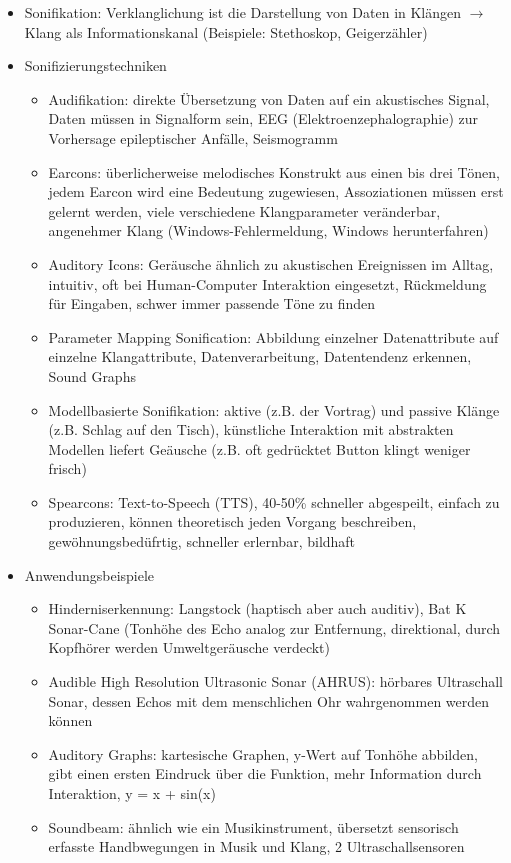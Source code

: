 \documentclass[paper=a4, fontsize=11pt]{scrartcl} %
\numberwithin{equation}{section} %
\numberwithin{figure}{section} %
\numberwithin{table}{section} %
\begin{document}
\begin{itemize}
\item Sonifikation: Verklanglichung ist die Darstellung von Daten in Klängen $\rightarrow$ Klang als Informationskanal (Beispiele: Stethoskop, Geigerzähler)
\item Sonifizierungstechniken
\begin{itemize}
\item Audifikation: direkte Übersetzung von Daten auf ein akustisches Signal, Daten müssen in Signalform sein, EEG (Elektroenzephalographie) zur Vorhersage epileptischer Anfälle, Seismogramm
\item Earcons: überlicherweise melodisches Konstrukt aus einen bis drei Tönen, jedem Earcon wird eine Bedeutung zugewiesen, Assoziationen müssen erst gelernt werden, viele verschiedene Klangparameter veränderbar, angenehmer Klang (Windows-Fehlermeldung, Windows herunterfahren)
\item Auditory Icons: Geräusche ähnlich zu akustischen Ereignissen im Alltag, intuitiv, oft bei Human-Computer Interaktion eingesetzt, Rückmeldung für Eingaben, schwer immer passende Töne zu finden
\item Parameter Mapping Sonification: Abbildung einzelner Datenattribute auf einzelne Klangattribute, Datenverarbeitung, Datentendenz erkennen, Sound Graphs
\item Modellbasierte Sonifikation: aktive (z.B. der Vortrag) und passive Klänge (z.B. Schlag auf den Tisch), künstliche Interaktion mit abstrakten Modellen liefert Geäusche (z.B. oft gedrücktet Button klingt weniger frisch)
\item Spearcons: Text-to-Speech (TTS), 40-50\% schneller abgespeilt, einfach zu produzieren, können theoretisch jeden Vorgang beschreiben, gewöhnungsbedüfrtig, schneller erlernbar, bildhaft
\end{itemize}
\item Anwendungsbeispiele
\begin{itemize}
\item Hinderniserkennung: Langstock (haptisch aber auch auditiv), Bat K Sonar-Cane (Tonhöhe des Echo analog zur Entfernung, direktional, durch Kopfhörer werden Umweltgeräusche verdeckt)
\item Audible High Resolution Ultrasonic Sonar (AHRUS): hörbares Ultraschall Sonar, dessen Echos mit dem menschlichen Ohr wahrgenommen werden können
\item Auditory Graphs: kartesische Graphen, y-Wert auf Tonhöhe abbilden, gibt einen ersten Eindruck über die Funktion, mehr Information durch Interaktion, y = x + sin(x)
\item Soundbeam: ähnlich wie ein Musikinstrument, übersetzt sensorisch erfasste Handbwegungen in Musik und Klang, 2 Ultraschallsensoren
\end{itemize}
\end{itemize}
\end{document}
